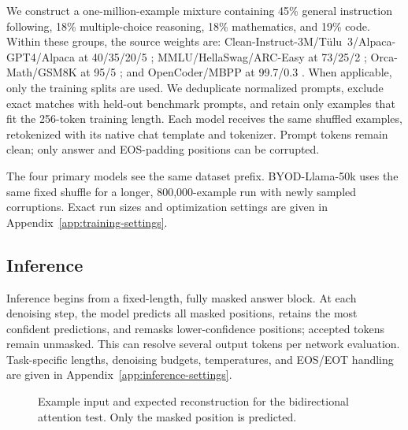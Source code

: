 \documentclass{article}
\begin{document}
We construct a one-million-example mixture containing 45\% general instruction following, 18\% multiple-choice reasoning, 18\% mathematics, and 19\% code. Within these groups, the source weights are: Clean-Instruct-3M/T\"ulu~3/Alpaca-GPT4/Alpaca at 40/35/20/5 \citep{cleaninstruct3m,lambert2024tulu3,peng2023instructiongpt4,taori2023alpaca}; MMLU/HellaSwag/ARC-Easy at 73/25/2 \citep{hendrycks2021mmlu,zellers2019hellaswag,clark2018arc}; Orca-Math/GSM8K at 95/5 \citep{mitra2024orcamath,cobbe2021gsm8k}; and OpenCoder/MBPP at 99.7/0.3 \citep{huang2024opencoder,austin2021mbpp}. When applicable, only the training splits are used. We deduplicate normalized prompts, exclude exact matches with held-out benchmark prompts, and retain only examples that fit the 256-token training length. Each model receives the same shuffled examples, retokenized with its native chat template and tokenizer. Prompt tokens remain clean; only answer and EOS-padding positions can be corrupted.

The four primary models see the same dataset prefix. BYOD-Llama-50k uses the same fixed shuffle for a longer, 800,000-example run with newly sampled corruptions. Exact run sizes and optimization settings are given in Appendix~\ref{app:training-settings}.

\subsection{Inference}
Inference begins from a fixed-length, fully masked answer block. At each denoising step, the model predicts all masked positions, retains the most confident predictions, and remasks lower-confidence positions; accepted tokens remain unmasked. This can resolve several output tokens per network evaluation. Task-specific lengths, denoising budgets, temperatures, and EOS/EOT handling are given in Appendix~\ref{app:inference-settings}.

\begin{figure}[t]
\centering
{}
\caption{Example input and expected reconstruction for the bidirectional attention test. Only the masked position is predicted.}
\label{fig:bidirectional-example}
\end{figure}
\end{document}
